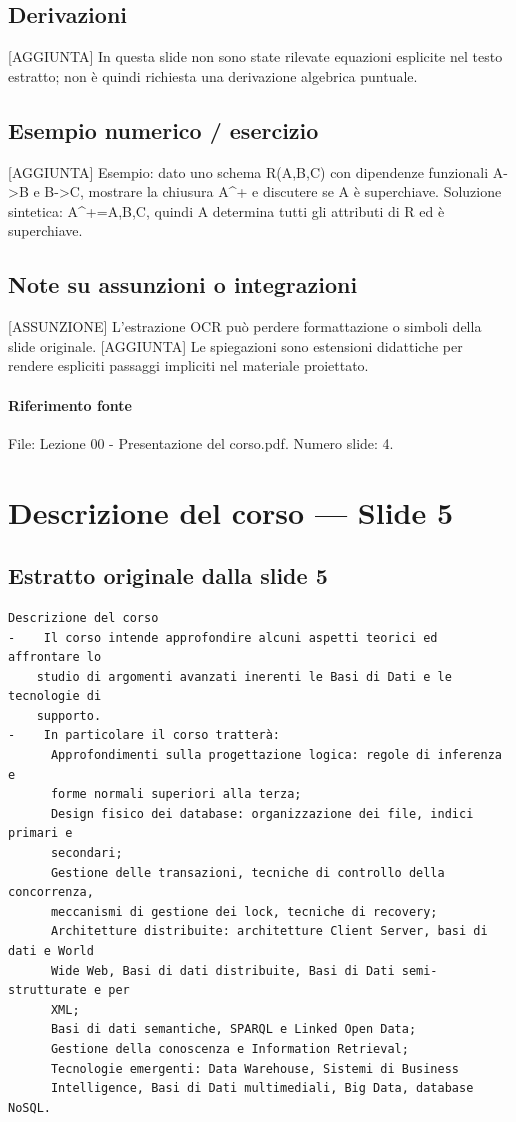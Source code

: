 \documentclass[11pt]{article}
\begin{document}
\subsection*{Derivazioni}
[AGGIUNTA] In questa slide non sono state rilevate equazioni esplicite nel testo estratto; non è quindi richiesta una derivazione algebrica puntuale.
\subsection*{Esempio numerico / esercizio}
[AGGIUNTA] Esempio: dato uno schema R(A,B,C) con dipendenze funzionali A->B e B->C, mostrare la chiusura A^+ e discutere se A è superchiave. Soluzione sintetica: A^+={A,B,C}, quindi A determina tutti gli attributi di R ed è superchiave.
\subsection*{Note su assunzioni o integrazioni}
[ASSUNZIONE] L'estrazione OCR può perdere formattazione o simboli della slide originale.
[AGGIUNTA] Le spiegazioni sono estensioni didattiche per rendere espliciti passaggi impliciti nel materiale proiettato.
\paragraph{Riferimento fonte} File: Lezione 00 - Presentazione del corso.pdf. Numero slide: 4.
\section{Descrizione del corso --- Slide 5}
\subsection*{Estratto originale dalla slide 5}
\begin{lstlisting}
Descrizione del corso
-    Il corso intende approfondire alcuni aspetti teorici ed affrontare lo
    studio di argomenti avanzati inerenti le Basi di Dati e le tecnologie di
    supporto.
-    In particolare il corso tratterà:
      Approfondimenti sulla progettazione logica: regole di inferenza e
      forme normali superiori alla terza;
      Design fisico dei database: organizzazione dei file, indici primari e
      secondari;
      Gestione delle transazioni, tecniche di controllo della concorrenza,
      meccanismi di gestione dei lock, tecniche di recovery;
      Architetture distribuite: architetture Client Server, basi di dati e World
      Wide Web, Basi di dati distribuite, Basi di Dati semi-strutturate e per
      XML;
      Basi di dati semantiche, SPARQL e Linked Open Data;
      Gestione della conoscenza e Information Retrieval;
      Tecnologie emergenti: Data Warehouse, Sistemi di Business
      Intelligence, Basi di Dati multimediali, Big Data, database NoSQL.
\end{lstlisting}
\end{document}
